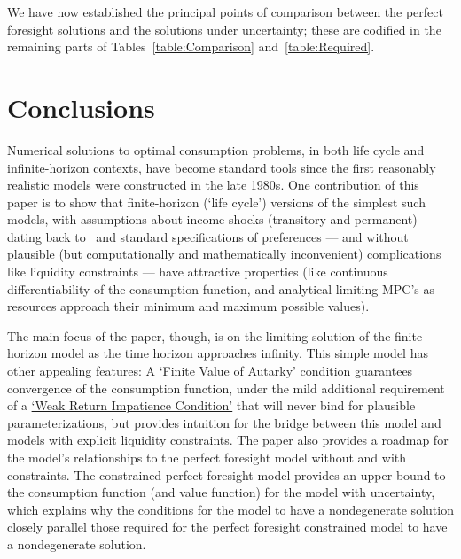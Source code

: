 \documentclass[BufferStockTheory]{subfiles}
\begin{document}
We have now established the principal points of comparison between the perfect foresight solutions and the solutions under uncertainty; these are codified in the remaining parts of Tables~\ref{table:Comparison} and~\ref{table:Required}.

\hypertarget{Factors-Defined-And-Compared}{}


\hypertarget{Required}{}


\newpage 
\hypertarget{Conclusions}{}
\section{Conclusions}

Numerical solutions to optimal consumption problems, in both life cycle and infinite-horizon contexts, have become standard tools since the first reasonably realistic models were constructed in the late 1980s.
One contribution of this paper is to show that finite-horizon (`life cycle') versions of the simplest such models, with assumptions about income shocks (transitory and permanent) dating back to~\cite{friedmanATheory} and standard specifications of preferences --- and without plausible (but computationally and mathematically inconvenient) complications like liquidity constraints --- have attractive properties (like continuous differentiability of the consumption function, and analytical limiting MPC's as resources approach their minimum and maximum possible values).%

The main focus of the paper, though, is on the limiting solution of the finite-horizon model as the time horizon approaches infinity.
This simple model has other appealing features: A \hyperlink{FVAC}{`Finite Value of Autarky'} condition guarantees convergence of the consumption function, under the mild additional requirement of a \hyperlink{WRIC}{`Weak Return Impatience Condition'} that will never bind for plausible parameterizations, but provides intuition for the bridge between this model and models with explicit liquidity constraints.
The paper also provides a roadmap for the model's relationships to the perfect foresight model without and with constraints.
The constrained perfect foresight model provides an upper bound to the consumption function (and value function) for the model with uncertainty, which explains why the conditions for the model to have a nondegenerate solution closely parallel those required for the perfect foresight constrained model to have a nondegenerate solution.
\end{document}

